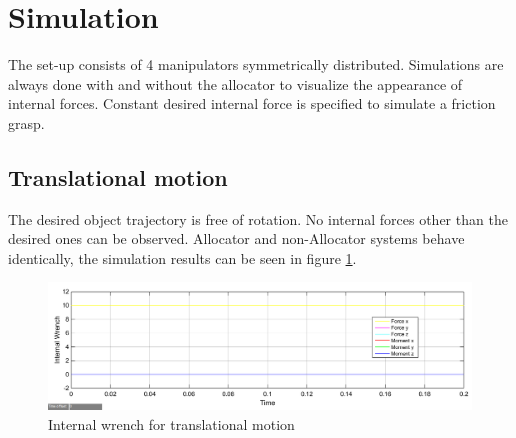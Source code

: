 \documentclass[conference]{IEEEtran}
\begin{document}
\section{Simulation}
The set-up consists of 4 manipulators symmetrically distributed. Simulations are always done with and without the allocator to visualize the appearance of internal forces. Constant desired internal force is specified to simulate a friction grasp.
\subsection{Translational motion}
The desired object trajectory is free of rotation. No internal forces other than the desired ones can be observed. Allocator and non-Allocator systems behave identically, the simulation results can be seen in figure \ref{IntForceAllocator}.
\begin{figure}
\includegraphics[width=\linewidth]{IntForceStepAllocator}
\caption{Internal wrench for translational motion}
\label{IntForceAllocator}
\end{figure}
\end{document}
